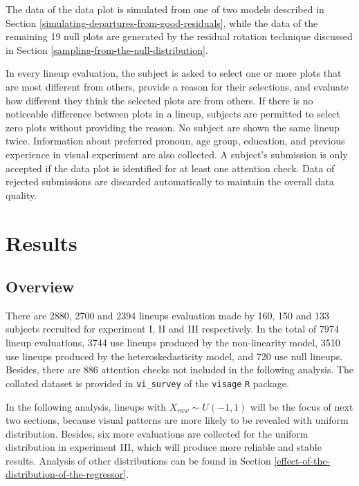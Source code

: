 \documentclass[]{interact}
\theoremstyle{plain}%
\theoremstyle{definition}
\theoremstyle{remark}
\begin{document}
The data of the data plot is simulated from one of two models described
in Section \ref{simulating-departures-from-good-residuals}, while the
data of the remaining 19 null plots are generated by the residual
rotation technique discussed in Section
\ref{sampling-from-the-null-distribution}.

In every lineup evaluation, the subject is asked to select one or more
plots that are most different from others, provide a reason for their
selections, and evaluate how different they think the selected plots are
from others. If there is no noticeable difference between plots in a
lineup, subjects are permitted to select zero plots without providing
the reason. No subject are shown the same lineup twice. Information
about preferred pronoun, age group, education, and previous experience
in visual experiment are also collected. A subject's submission is only
accepted if the data plot is identified for at least one attention
check. Data of rejected submissions are discarded automatically to
maintain the overall data quality.

\hypertarget{results}{%
\section{Results}\label{results}}

\hypertarget{overview}{%
\subsection{Overview}\label{overview}}

There are 2880, 2700 and 2394 lineups evaluation made by 160, 150 and
133 subjects recruited for experiment I, II and III respectively. In the
total of 7974 lineup evaluations, 3744 use lineups produced by the
non-linearity model, 3510 use lineups produced by the heteroskedasticity
model, and 720 use null lineups. Besides, there are 886 attention checks
not included in the following analysis. The collated dataset is provided
in \texttt{vi\_survey} of the \texttt{visage} \texttt{R} package.

In the following analysis, lineups with \(X_{raw} \sim U(-1,1)\) will be
the focus of next two sections, because visual patterns are more likely
to be revealed with uniform distribution. Besides, six more evaluations
are collected for the uniform distribution in experiment III, which will
produce more reliable and stable results. Analysis of other
distributions can be found in Section
\ref{effect-of-the-distribution-of-the-regressor}.
\end{document}
